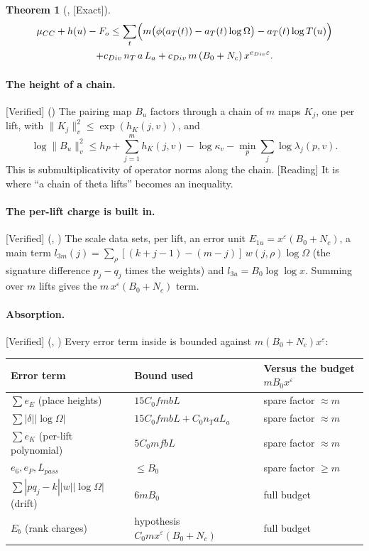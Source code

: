 \documentclass[11pt]{article}
\newcommand{\Exact}{\textcolor{exactc}{\textsf{\small[Exact]}}}
\newcommand{\Verified}{\textcolor{verc}{\textsf{\small[Verified]}}}
\newcommand{\Reading}{\textcolor{readc}{\textsf{\small[Reading]}}}
\newcommand{\eps}{\varepsilon}
\theoremstyle{plain}
\newtheorem{theorem}{Theorem}[section]
\theoremstyle{definition}
\begin{document}
\begin{theorem}[, \Exact]\label{thm:DIV}
\begin{multline*}
\mu_{CC}+h(u)-F_o \le \sum_t\Bigl(m\bigl(\phi(a_T(t))-a_T(t)\log\Omega\bigr)-a_T(t)\log T(u)\Bigr)\\
+ c_{Div}\,n_T\,a\,L_a + c_{Div}\,m\,(B_0+N_c)\,x^{e_{Div}\eps}.
\end{multline*}
\end{theorem}

\paragraph{The height of a chain.} \Verified{} () The pairing map $B_u$
factors through a chain of $m$ maps $K_j$, one per lift, with $\|K_j\|_v^2\le\exp(h_K(j,v))$, and
\[
\log\|B_u\|_v^2\le h_P+\sum_{j=1}^m h_K(j,v)-\log\kappa_v-\min_p\sum_j\log\lambda_j(p,v).
\]
This is submultiplicativity of operator norms along the chain. \Reading{} It is where ``a chain of
theta lifts'' becomes an inequality.

\paragraph{The per-lift charge is built in.} \Verified{} (, )
The scale data sets, per lift, an error unit $E_{1u}=x^\eps(B_0+N_c)$, a main term
$l_{3m}(j)=\sum_\rho[(k+j-1)-(m-j)]\,w(j,\rho)\log\Omega$ (the signature difference $p_j-q_j$ times
the weights) and $l_{3u}=B_0\log\log x$. Summing over $m$ lifts gives the $m\,x^\eps(B_0+N_c)$ term.

\paragraph{Absorption.} \Verified{} (, )
Every error term inside  is bounded against $m(B_0+N_c)x^\eps$:

\begin{center}
\renewcommand{\arraystretch}{1.15}
\begin{tabular}{@{}lll@{}}
\toprule
Error term & Bound used & Versus the budget $mB_0x^\eps$\\
\midrule
$\sum e_E$ (place heights) & $15C_0 f m b L$ & spare factor $\approx m$\\
$\sum|\delta||\log\Omega|$ & $15C_0fmbL + C_0n_TaL_a$ & spare factor $\approx m$\\
$\sum e_K$ (per-lift polynomial) & $5C_0 m f b L$ & spare factor $\approx m$\\
$e_6,e_P,L_{pass}$ & $\le B_0$ & spare factor $\ge m$\\
$\sum|pq_j-k||w||\log\Omega|$ (drift) & $6mB_0$ & full budget\\
$E_b$ (rank charges) & hypothesis $C_0mx^\eps(B_0+N_c)$ & full budget\\
\bottomrule
\end{tabular}
\end{center}
\end{document}
